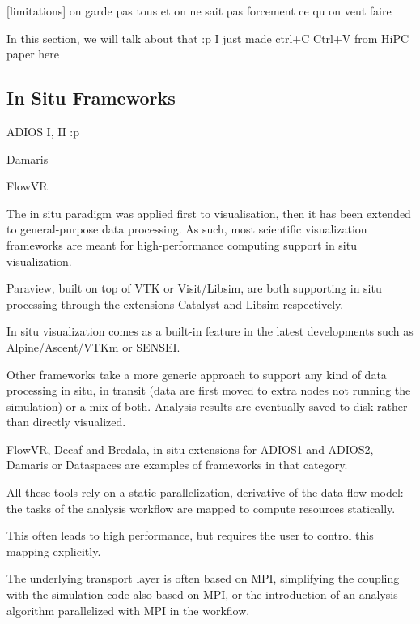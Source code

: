 [limitations] on garde pas tous et on ne sait pas forcement ce qu on veut faire 


In this section, we will talk about that :p
I just made ctrl+C Ctrl+V from HiPC paper here 
\subsection{In Situ Frameworks}

ADIOS I, II :p 

Damaris 

FlowVR

The in situ paradigm was applied first to visualisation\cite{InSituLiuMa:2007}, then it has been extended to general-purpose data processing. As such, most scientific visualization frameworks are meant for high-performance computing support in situ visualization.

Paraview\cite{ahrens_paraview_2005}, built on top of VTK\cite{hanwell_visualization_2015_vtk} or Visit/Libsim\cite{childs_visit_nodate}, are both supporting in situ processing through the extensions Catalyst\cite{catalyst11} and Libsim\cite{libsim11} respectively.

In situ visualization comes as a built-in feature in the latest developments such as Alpine/Ascent/VTKm\cite{Larsen-alpine-isav17,moreland_vtk-m_2016} or SENSEI\cite{ayachit_sensei_2016}.

Other frameworks take a more generic approach to support any kind of data processing in situ, in transit (data are first moved to extra nodes not running the simulation) or a mix of both.
Analysis results are eventually saved to disk rather than directly visualized.

FlowVR\cite{dreher_flexible_2014}, 
Decaf\cite{dreher_decaf_2017} and Bredala\cite{dreher_bredala_2016}, 
in situ extensions for ADIOS1\cite{lofstead_insights_2013_adios,boyuka_transparent_2014_adios} and ADIOS2\cite{godoy_adios2_2020}, Damaris\cite{dorier_damaris_2012} or 
Dataspaces\cite{docan_dataspaces_2012} are examples of frameworks in that category.

All these tools rely on a static parallelization, derivative of the data-flow model: the tasks of the analysis workflow are mapped to compute resources statically.

This often leads to high performance, but requires the user to control this mapping explicitly.

The underlying transport layer is often based on MPI, simplifying the coupling with the simulation code also based on MPI, or the introduction of an analysis algorithm parallelized with MPI in the workflow.


